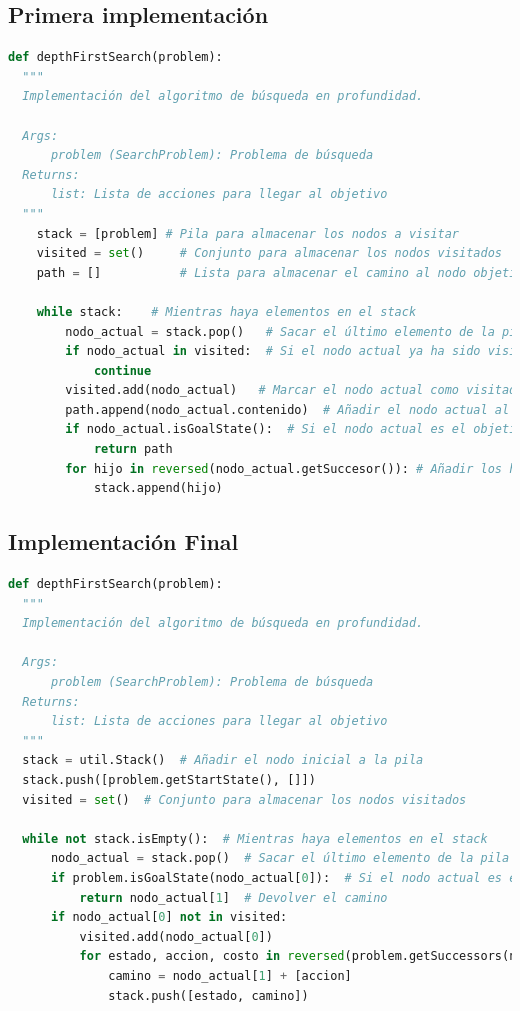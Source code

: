 \documentclass{report}
\begin{document}
        \subsection*{Primera implementación}
          \begin{lstlisting}[language=Python, caption=Implementación final del DFS]
  def depthFirstSearch(problem):
  """
  Implementación del algoritmo de búsqueda en profundidad.

  Args:
      problem (SearchProblem): Problema de búsqueda
  Returns:
      list: Lista de acciones para llegar al objetivo
  """
    stack = [problem] # Pila para almacenar los nodos a visitar
    visited = set()     # Conjunto para almacenar los nodos visitados
    path = []           # Lista para almacenar el camino al nodo objetivo

    while stack:    # Mientras haya elementos en el stack
        nodo_actual = stack.pop()   # Sacar el último elemento de la pila
        if nodo_actual in visited:  # Si el nodo actual ya ha sido visitado
            continue
        visited.add(nodo_actual)   # Marcar el nodo actual como visitado
        path.append(nodo_actual.contenido)  # Añadir el nodo actual al camino
        if nodo_actual.isGoalState():  # Si el nodo actual es el objetivo
            return path
        for hijo in reversed(nodo_actual.getSuccesor()): # Añadir los hijos del nodo actual a la pila
            stack.append(hijo)
          \end{lstlisting}
        \clearpage\subsection*{Implementación Final}
          \begin{lstlisting}[language=Python, caption=Implementación final del DFS]
  def depthFirstSearch(problem):
  """
  Implementación del algoritmo de búsqueda en profundidad.

  Args:
      problem (SearchProblem): Problema de búsqueda
  Returns:
      list: Lista de acciones para llegar al objetivo
  """
  stack = util.Stack()  # Añadir el nodo inicial a la pila
  stack.push([problem.getStartState(), []])
  visited = set()  # Conjunto para almacenar los nodos visitados

  while not stack.isEmpty():  # Mientras haya elementos en el stack
      nodo_actual = stack.pop()  # Sacar el último elemento de la pila
      if problem.isGoalState(nodo_actual[0]):  # Si el nodo actual es el objetivo
          return nodo_actual[1]  # Devolver el camino
      if nodo_actual[0] not in visited:
          visited.add(nodo_actual[0])
          for estado, accion, costo in reversed(problem.getSuccessors(nodo_actual[0])): 
              camino = nodo_actual[1] + [accion]
              stack.push([estado, camino])
          \end{lstlisting}
\end{document}
